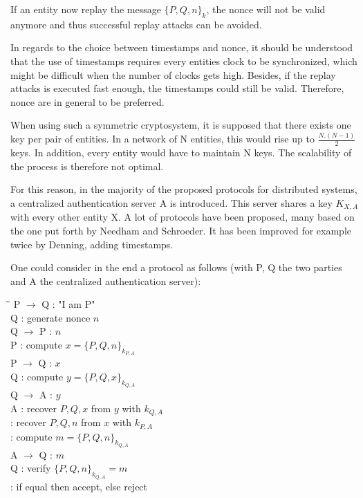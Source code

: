 If an entity now replay the message $\lbrace P, Q, n \rbrace_{k}$, the nonce will not be valid anymore and thus successful replay attacks can be avoided.

In regards to the choice between timestamps and nonce, it should be understood that the use of timestamps requires every entities clock to be synchronized, which might be difficult when the number of clocks gets high. Besides, if the replay attacks is executed fast enough, the timestamps could still be valid. Therefore, nonce are in general to be preferred.
\label{02_timestamp_vs_nonce}

When using such a symmetric cryptosystem, it is supposed that there exists one key per pair of entities. In a network of N entities, this would rise up to $\frac{N.(N-1)}{2}$ keys. In addition, every entity would have to maintain N keys. The scalability of the process is therefore not optimal. 

For this reason, in the majority of the proposed protocols for distributed systems, a centralized authentication server A is introduced. This server shares a key $K_{X,A}$ with every other entity X. A lot of protocols have been proposed, many based on the one put forth by Needham and Schroeder\cite{needham1978using}. It has been improved for example twice by Denning\cite{denning1981timestamps}\cite{robling1982cryptography}, adding timestamps. 

One could consider in the end a protocol as follows (with P, Q the two parties and A the centralized authentication server):

\begin{tabbing}
	\hspace{4em}\=\hspace{4em}\=\hspace{2em}\=\kill
	\>  P $\rightarrow$ Q \>  : \> "I am P" \\
	\>  Q  \>  : \> generate nonce $n$ \\
	\>  Q $\rightarrow$ P \>  : \> $n$ \\
	\>  P  \>  : \> compute $x = \lbrace P, Q, n \rbrace_{k_{P,A}}$ 				\\
	\>  P $\rightarrow$ Q \>  : \> $x$ \\
	\>  Q  \>  : \> compute $y = \lbrace P, Q, x \rbrace_{k_{Q,A}}$ 				\\
	\>  Q $\rightarrow$ A \>  : \> $y$ \\
	\>  A  \>  : \> recover $P,Q,x$ from $y$ with $k_{Q,A}$ \\
	\>    \>  : \> recover $P,Q,n$ from $x$ with $k_{P,A}$ \\
	\>    \>  : \> compute $m = \lbrace P,Q,n \rbrace_{k_{Q,A}}$ \\
	\>  A $\rightarrow$ Q \>  : \> $m$ \\
	\>  Q \>  : \> verify $\lbrace P, Q, n \rbrace_{k_{Q,A}} = m$ \\
	\>    \>  : \> if equal then accept, else reject \\
\end{tabbing} 

